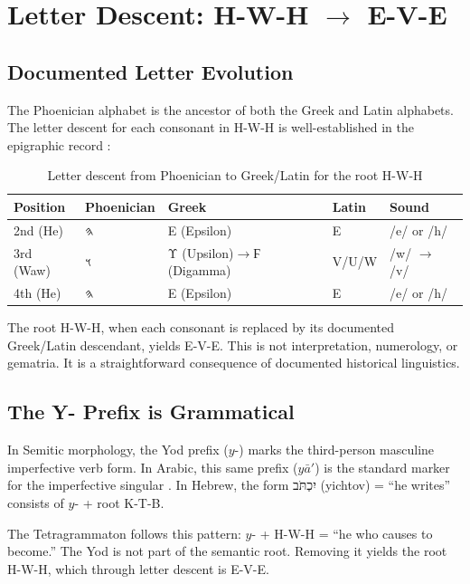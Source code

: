 \documentclass[12pt]{article}
\begin{document}
\section{Letter Descent: H-W-H $\to$ E-V-E}

\subsection{Documented Letter Evolution}

The Phoenician alphabet is the ancestor of both the Greek and Latin alphabets. The letter descent for each consonant in H-W-H is well-established in the epigraphic record \cite{jeffery1990, naveh1982, cross1989}:

\begin{table}[h]
\centering
\begin{tabular}{lllll}
\toprule
Position & Phoenician & Greek & Latin & Sound \\
\midrule
2nd (He) & 𐤄 & Ε (Epsilon) & E & /e/ or /h/ \\
3rd (Waw) & 𐤅 & Υ (Upsilon)$\to$Ϝ (Digamma) & V/U/W & /w/ $\to$ /v/ \\
4th (He) & 𐤄 & Ε (Epsilon) & E & /e/ or /h/ \\
\bottomrule
\end{tabular}
\caption{Letter descent from Phoenician to Greek/Latin for the root H-W-H}
\end{table}

The root H-W-H, when each consonant is replaced by its documented Greek/Latin descendant, yields E-V-E. This is not interpretation, numerology, or gematria. It is a straightforward consequence of documented historical linguistics.

\subsection{The Y- Prefix is Grammatical}

In Semitic morphology, the Yod prefix ($y$-) marks the third-person masculine imperfective verb form. In Arabic, this same prefix ($y\bar{a}'$) is the standard marker for the imperfective singular \cite{versteegh1997}. In Hebrew, the form יִכְתֹּב (yichtov) = ``he writes'' consists of $y$- + root K-T-B.

The Tetragrammaton follows this pattern: $y$- + H-W-H = ``he who causes to become.'' The Yod is not part of the semantic root. Removing it yields the root H-W-H, which through letter descent is E-V-E.
\end{document}

